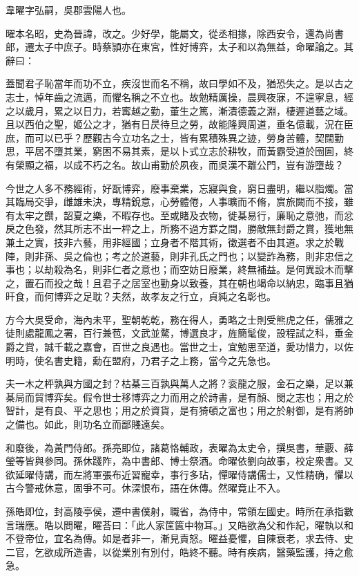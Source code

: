 
\begin{pinyinscope}
韋曜字弘嗣，吳郡雲陽人也。

曜本名昭，史為晉諱，改之。少好學，能屬文，從丞相掾，除西安令，還為尚書郎，遷太子中庶子。時蔡頴亦在東宮，性好博弈，太子和以為無益，命曜論之。其辭曰：

蓋聞君子恥當年而功不立，疾沒世而名不稱，故曰學如不及，猶恐失之。是以古之志士，悼年齒之流邁，而懼名稱之不立也。故勉精厲操，晨興夜寐，不遑寧息，經之以歲月，累之以日力，若寗越之勤，董生之篤，漸漬德義之淵，棲遲道藝之域。且以西伯之聖，姬公之才，猶有日昃待旦之勞，故能隆興周道，垂名億載，況在臣庶，而可以已乎？歷觀古今立功名之士，皆有累積殊異之迹，勞身苦體，契闊勤思，平居不墮其業，窮困不易其素，是以卜式立志於耕牧，而黃霸受道於囹圄，終有榮顯之福，以成不朽之名。故山甫勤於夙夜，而吳漢不離公門，豈有游墮哉？

今世之人多不務經術，好翫博弈，廢事棄業，忘寢與食，窮日盡明，繼以脂燭。當其臨局交爭，雌雄未決，專精銳意，心勞體倦，人事曠而不脩，賔旅闕而不接，雖有太牢之饌，韶夏之樂，不暇存也。至或賭及衣物，徙棊易行，廉恥之意弛，而忿戾之色發，然其所志不出一枰之上，所務不過方罫之間，勝敵無封爵之賞，獲地無兼土之實，技非六藝，用非經國；立身者不階其術，徵選者不由其道。求之於戰陣，則非孫、吳之倫也；考之於道藝，則非孔氏之門也；以變詐為務，則非忠信之事也；以劫殺為名，則非仁者之意也；而空妨日廢業，終無補益。是何異設木而擊之，置石而投之哉！且君子之居室也勤身以致養，其在朝也竭命以納忠，臨事且猶旰食，而何博弈之足耽？夫然，故孝友之行立，貞純之名彰也。

方今大吳受命，海內未平，聖朝乾乾，務在得人，勇略之士則受熊虎之任，儒雅之徒則處龍鳳之署，百行兼苞，文武並騖，博選良才，旌簡髦俊，設程試之科，垂金爵之賞，誠千載之嘉會，百世之良遇也。當世之士，宜勉思至道，愛功惜力，以佐明時，使名書史籍，勳在盟府，乃君子之上務，當今之先急也。

夫一木之枰孰與方國之封？枯棊三百孰與萬人之將？衮龍之服，金石之樂，足以兼棊局而貿博弈矣。假令世士移博弈之力而用之於詩書，是有顏、閔之志也；用之於智計，是有良、平之思也；用之於資貨，是有猗頓之富也；用之於射御，是有將帥之備也。如此，則功名立而鄙賤遠矣。

和廢後，為黃門侍郎。孫亮即位，諸葛恪輔政，表曜為太史令，撰吳書，華覈、薛瑩等皆與參同。孫休踐阼，為中書郎、博士祭酒。命曜依劉向故事，校定衆書。又欲延曜侍講，而左將軍張布近習寵幸，事行多玷，憚曜侍講儒士，又性精确，懼以古今警戒休意，固爭不可。休深恨布，語在休傳。然曜竟止不入。

孫皓即位，封高陵亭侯，遷中書僕射，職省，為侍中，常領左國史。時所在承指數言瑞應。皓以問曜，曜荅曰：「此人家筐篋中物耳。」又皓欲為父和作紀，曜執以和不登帝位，宜名為傳。如是者非一，漸見責怒。曜益憂懼，自陳衰老，求去侍、史二官，乞欲成所造書，以從業別有別付，皓終不聽。時有疾病，醫藥監護，持之愈急。


\end{pinyinscope}
